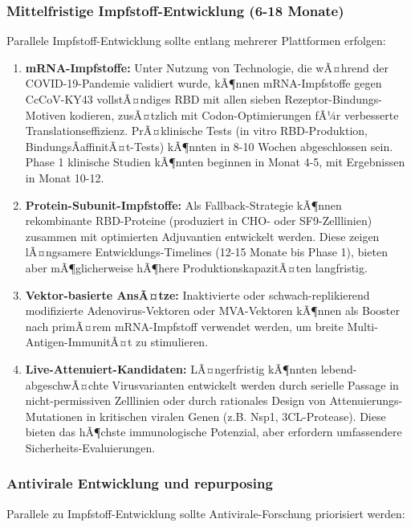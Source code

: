 ﻿\documentclass[11pt,a4paper]{article}
\theoremstyle{definition}
\begin{document}
\subsubsection{Mittelfristige Impfstoff-Entwicklung (6-18 Monate)}

Parallele Impfstoff-Entwicklung sollte entlang mehrerer Plattformen erfolgen:

\begin{enumerate}
\item \textbf{mRNA-Impfstoffe:} Unter Nutzung von Technologie, die wÃ¤hrend der COVID-19-Pandemie validiert wurde, kÃ¶nnen mRNA-Impfstoffe gegen CcCoV-KY43 vollstÃ¤ndiges RBD mit allen sieben Rezeptor-Bindungs-Motiven kodieren, zusÃ¤tzlich mit Codon-Optimierungen fÃ¼r verbesserte Translationseffizienz. PrÃ¤klinische Tests (in vitro RBD-Produktion, BindungsÂ­affinitÃ¤t-Tests) kÃ¶nnten in 8-10 Wochen abgeschlossen sein. Phase 1 klinische Studien kÃ¶nnten beginnen in Monat 4-5, mit Ergebnissen in Monat 10-12.

\item \textbf{Protein-Subunit-Impfstoffe:} Als Fallback-Strategie kÃ¶nnen rekombinante RBD-Proteine (produziert in CHO- oder SF9-Zelllinien) zusammen mit optimierten Adjuvantien entwickelt werden. Diese zeigen lÃ¤ngsamere Entwicklungs-Timelines (12-15 Monate bis Phase 1), bieten aber mÃ¶glicherweise hÃ¶here ProduktionskapazitÃ¤ten langfristig.

\item \textbf{Vektor-basierte AnsÃ¤tze:} Inaktivierte oder schwach-replikierend modifizierte Adenovirus-Vektoren oder MVA-Vektoren kÃ¶nnen als Booster nach primÃ¤rem mRNA-Impfstoff verwendet werden, um breite Multi-Antigen-ImmunitÃ¤t zu stimulieren.

\item \textbf{Live-Attenuiert-Kandidaten:} LÃ¤ngerfristig kÃ¶nnten lebend-abgeschwÃ¤chte Virusvarianten entwickelt werden durch serielle Passage in nicht-permissiven Zelllinien oder durch rationales Design von Attenuierungs-Mutationen in kritischen viralen Genen (z.B. Nsp1, 3CL-Protease). Diese bieten das hÃ¶chste immunologische Potenzial, aber erfordern umfassendere Sicherheits-Evaluierungen.
\end{enumerate}

\subsubsection{Antivirale Entwicklung und repurposing}

Parallele zu Impfstoff-Entwicklung sollte Antivirale-Forschung priorisiert werden:
\end{document}
